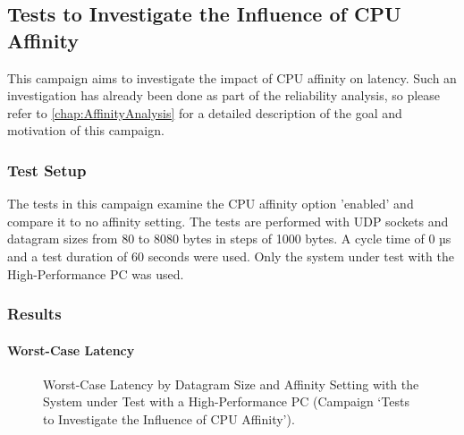 \subsection{Tests to Investigate the Influence of CPU Affinity}
This campaign aims to investigate the impact of \ac{CPU} affinity on latency. Such an investigation has already been done as part of the reliability analysis, so please refer to \ref{chap:AffinityAnalysis} for a detailed description of the goal and motivation of this campaign.

\subsubsection{Test Setup}
The tests in this campaign examine the \ac{CPU} affinity option 'enabled' and compare it to no affinity setting. The tests are performed with UDP sockets and datagram sizes from 80 to 8080 bytes in steps of 1000 bytes. A cycle time of 0 µs and a test duration of 60 seconds were used. Only the system under test with the High-Performance PC was used.

\subsubsection{Results}
\paragraph{Worst-Case Latency}

\begin{figure}[h!]
  \centering
  \caption{Worst-Case Latency by Datagram Size and Affinity Setting with the System under Test with a High-Performance PC (Campaign `Tests to Investigate the Influence of \ac{CPU} Affinity').}
  \label{fig:AffWc}
\end{figure}

